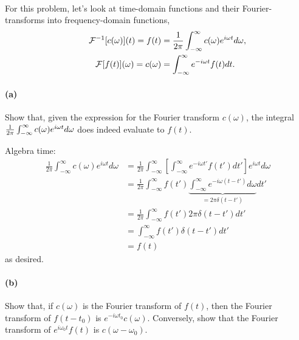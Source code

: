 \documentclass{article}
\begin{document}
\paragraph{}
For this problem, let's look at time-domain functions and their Fourier-transforms into frequency-domain functions,
	\begin{align}
		\mathcal{F}^{-1}[c(\omega)](t) = f(t) &= \frac{1}{2\pi}\int_{-\infty}^{\infty} c(\omega)e^{i\omega t}d\omega,					\label{fouriert}\\
		\qquad\quad		
		\mathcal{F}[f(t)](\omega) = c(\omega) &= \int_{-\infty}^{\infty} e^{-i\omega t} f(t)dt.		\label{inversefouriert}
	\end{align}

\paragraph{(a)}
Show that, given the expression for the Fourier transform $c(\omega)$, the integral $\frac{1}{2\pi}\int_{-\infty}^{\infty} c(\omega)e^{i\omega t}d\omega$ does indeed 
evaluate to $f(t)$.\\

\begin{solution}
	Algebra time:
	\begin{align*}
		\frac{1}{2\pi}\int_{-\infty}^\infty c(\omega) e^{i \omega t} d \omega &= \frac{1}{2\pi}
		\int_{-\infty}^\infty \left[ \int_{-\infty}^\infty e^{-i \omega t'} f(t') dt'\right] e^{i \omega t} d\omega\\
	&= \frac{1}{2\pi}\int_{-\infty}^\infty f(t') \underbrace{\int_{-\infty}^\infty  e^{-i\omega(t - t')} d\omega}_{= 2\pi \delta(t - t')} dt' \\
	&= \frac{1}{2\pi}\int_{-\infty}^\infty f(t') 2\pi \delta(t - t') dt' \\
	&= \int_{-\infty}^\infty f(t') \delta(t - t') dt' \\
	&= f(t) 
	\end{align*}
	as desired. 
\end{solution}

\paragraph{(b)}		\extrapart
Show that, if $c(\omega)$ is the Fourier transform of $f(t)$, then the Fourier transform of $f(t-t_{0})$ is $e^{-i\omega t_{0}}c(\omega)$.  
Conversely, show that the Fourier transform of $e^{i\omega_{0}t}f(t)$ is $c(\omega-\omega_{0})$.
\end{document}
